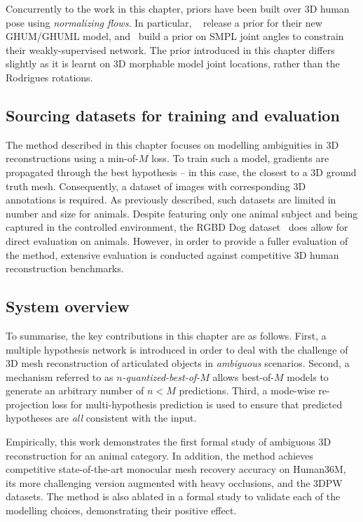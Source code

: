 Concurrently to the work in this chapter, priors have been built over 3D human pose using \emph{normalizing flows}. In particular, ~\cite{xu-2020-cvpr} release a prior for their new GHUM/GHUML model, and~\cite{weakly-supervised-normflow} build a prior on SMPL joint angles to constrain their weakly-supervised network. The prior introduced in this chapter differs slightly as it is learnt on 3D morphable model joint locations, rather than the Rodrigues rotations.



\subsection{Sourcing datasets for training and evaluation}

The method described in this chapter focuses on modelling ambiguities in 3D reconstructions using a min-of-$M$ loss. To train such a model, gradients are propagated through the best hypothesis -- in this case, the closest to a 3D ground truth mesh. Consequently, a dataset of images with corresponding 3D annotations is required. As previously described, such datasets are limited in number and size for animals. Despite featuring only one animal subject and being captured in the controlled environment, the RGBD Dog dataset~\cite{xxx} does allow for direct evaluation on animals. However, in order to provide a fuller evaluation of the method, extensive evaluation is conducted against competitive 3D human reconstruction benchmarks.

\subsection{System overview}
To summarise, the key contributions in this chapter are as follows.
First, a multiple hypothesis network is introduced in order to deal with the challenge of 3D mesh reconstruction of articulated objects in \emph{ambiguous} scenarios.
Second, a mechanism referred to as \emph{$n$-quantized-best-of-$M$} allows best-of-$M$ models to generate an arbitrary number of $n<M$ predictions.
Third, a mode-wise re-projection loss for multi-hypothesis prediction is used to ensure that predicted hypotheses are \emph{all} consistent with the input.

Empirically, this work demonstrates the first formal study of ambiguous 3D reconstruction for an animal category. In addition, the method achieves competitive state-of-the-art monocular mesh recovery accuracy on Human36M, its more challenging version augmented with heavy occlusions, and the 3DPW datasets. 
The method is also ablated in a formal study to validate each of the modelling choices, demonstrating their positive effect.

